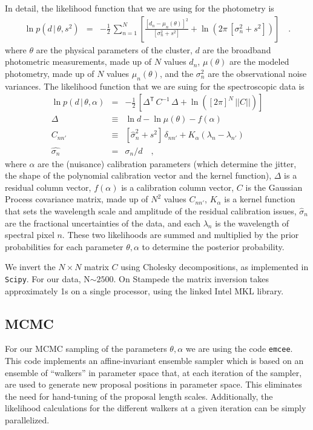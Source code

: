\documentclass[11pt,preprint]{aastex}
\newcommand{\transpose}[1]{{#1}^{\!\mathsf T}}
\newcommand{\given}{\,|\,}
\renewcommand{\det}[1]{||{#1}||}
\begin{document}
In detail, the likelihood function that we are using for the photometry is 
\begin{eqnarray}\label{eq:photometricLF}
\ln p(d\given\theta,s^2) &=& -\frac{1}{2}\,\sum_{n=1}^N \left[\frac{[d_n - \mu_n(\theta)]^2}{[\sigma_n^2 + s^2]} + \ln(2\pi\,[\sigma_n^2 + s^2]) \right]
\quad .
\end{eqnarray}
where $\theta$ are the physical parameters of the cluster,
$d$ are the broadband photometric measurements,
made up of $N$ values $d_n$,
$\mu(\theta)$ are the modeled photometry,
made up of $N$ values $\mu_n(\theta)$, and
the $\sigma_n^2$ are the observational noise variances.
The likelihood function that we are suing for the spectroscopic data is 
\begin{eqnarray}\label{eq:spectroscopicLF}
\ln p(d\given\theta,\alpha) &=& -\frac{1}{2}\,\left[\transpose{\Delta}\,C^{-1}\,\Delta + \ln([2\pi]^N\,\det{C}) \right]
\\
\Delta &\equiv& \ln d - \ln \mu(\theta) - f(\alpha) 
\\
C_{nn'} &\equiv& [\hat{\sigma}_n^2 + s^2]\,\delta_{nn'} +
K_\alpha(\lambda_n - \lambda_{n'})
\\
\hat{\sigma_n} & = &\sigma_n/d
\quad ,
\end{eqnarray}
where $\alpha$ are the (nuisance) calibration parameters
(which determine the jitter, the shape of the polynomial calibration vector and the kernel function),
$\Delta$ is a residual column vector,
$f(\alpha)$ is a calibration column vector,
$C$ is the Gaussian Process covariance matrix,
made up of $N^2$ values $C_{nn'}$,
$K_\alpha$ is a kernel function that sets the wavelength scale and
amplitude of the residual calibration issues,
$\hat{\sigma}_n$ are the fractional uncertainties of the data,
and each $\lambda_n$ is the wavelength of spectral pixel $n$.
These two likelihoods are summed and multiplied by the prior probabilities for each parameter ${\theta, \alpha}$ to determine the posterior probability.

We invert the $N \times N$ matrix $C$ using Cholesky decompositions, as implemented in \texttt{Scipy}. 
For our data, N$\sim 2500$.  
On Stampede the matrix inversion takes approximately 1s on a single processor, using the linked Intel MKL library.

\subsection{MCMC}
For our MCMC sampling of the parameters ${\theta, \alpha}$ we are using the code \texttt{emcee}.  
This code implements an affine-invariant ensemble sampler \citep{goodman_weare} which is based on an ensemble of ``walkers'' in parameter space that, at each iteration of the sampler, are used to generate new proposal positions in parameter space.  
This eliminates the need for hand-tuning of the proposal length scales.  
Additionally, the likelihood calculations for the different walkers at a given iteration can be simply parallelized.
\end{document}
